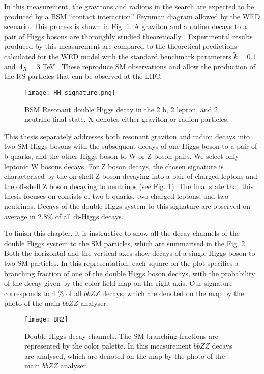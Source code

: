 In this measurement, the gravitons and radions in the search are expected to be produced by a BSM ``contact interaction'' Feynman diagram allowed by the WED scenario. This process is shown in Fig. \ref{HH_signature}.  A graviton and a radion decays to a pair of Higgs bosons are thoroughly studied theoretically \cite{Chen:2014xra, HHXsec, Contino:2012xk}. Experimental results produced by this measurement are compared to the theoretical predictions calculated for the WED model with the standard benchmark parameters $\tilde{k}=0.1$ and $\Lambda_R = 3 $ TeV \cite{Wertz:2632195, Cadamuro:2292733}. These reproduce SM observations and allow the production of the RS particles that can be observed at the LHC. 





\begin{figure}[H]
  \centering
    \texttt{[image: HH\_signature.png]}
    \caption{BSM Resonant double Higgs decay in the 2 b, 2 lepton, and 2 neutrino final state. X denotes either graviton or radion particles. }
    \label{HH_signature}
\end{figure}




This thesis separately addresses both resonant graviton and radion decays into two SM Higgs bosons with the subsequent decays of one Higgs boson to a pair of b quarks, and the other Higgs boson to W or Z boson pairs. We select only leptonic W bosons decays. For Z boson decays, the chosen signature is characterised by the on-shell Z boson decaying into a pair of charged leptons and the off-shell Z boson decaying to neutrinos (see Fig. \ref{HH_signature}). The final state that this thesis focuses on consists of two b quarks, two charged leptons, and two neutrinos. Decays of the double Higgs system to this signature are observed on average in $2.8 \%$ of all di-Higgs decays. 


To finish this chapter, it is instructive to show all the decay channels of the double Higgs system to the SM particles, which are summarised in the Fig. \ref{BR}. Both the horizontal and the vertical axes show decays of a single Higgs boson to two SM particles. In this representation, each square on the plot specifies a branching fraction of one of the double Higgs boson decays, with the probability of the decay given by the color field map on the right axis. Our signature corresponds to 4 $\%$ of all $bbZZ$ decays, which are denoted on the map by the photo of the main $bbZZ$ analyser. 

\begin{figure}[H]
  \centering
    \texttt{[image: BR2]}
    \caption[Double Higgs decay channels]{Double Higgs decay channels. The SM branching fractions are represented by the color palette. In this measurement $bbZZ$ decays are analysed, which are denoted on the map by the photo of the main $bbZZ$ analyser.}
    \label{BR}
\end{figure}



